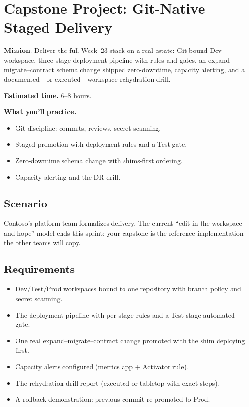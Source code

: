 \section{Capstone Project: Git-Native Staged Delivery}\label{sec:ch23-capstone}

\begin{capstonebox}
\textbf{Mission.} Deliver the full Week~23 stack on a real estate: Git-bound Dev workspace, three-stage deployment pipeline with rules and gates, an expand--migrate--contract schema change shipped zero-downtime, capacity alerting, and a documented---or executed---workspace rehydration drill.

\textbf{Estimated time.} 6--8 hours.

\textbf{What you'll practice.}
\begin{itemize}
    \item Git discipline: commits, reviews, secret scanning.
    \item Staged promotion with deployment rules and a Test gate.
    \item Zero-downtime schema change with shims-first ordering.
    \item Capacity alerting and the DR drill.
\end{itemize}
\end{capstonebox}

\subsection*{Scenario}
Contoso's platform team formalizes delivery. The current ``edit in the workspace and hope'' model ends this sprint; your capstone is the reference implementation the other teams will copy.

\subsection*{Requirements}
\begin{itemize}
    \item Dev/Test/Prod workspaces bound to one repository with branch policy and secret scanning.
    \item The deployment pipeline with per-stage rules and a Test-stage automated gate.
    \item One real expand--migrate--contract change promoted with the shim deploying first.
    \item Capacity alerts configured (metrics app + Activator rule).
    \item The rehydration drill report (executed or tabletop with exact steps).
    \item A rollback demonstration: previous commit re-promoted to Prod.
\end{itemize}


